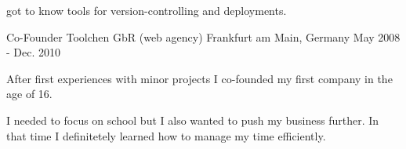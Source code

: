 \begin{cventries}
{\begin{cvitems}
      \item {got to know tools for version-controlling and deployments.}
    \end{cvitems}
  }
\cventry
  {Co-Founder}
  {Toolchen GbR (web agency)}
  {Frankfurt am Main, Germany}
  {May 2008 - Dec. 2010}
  {
    \begin{cvitems}
      \item {After first experiences with minor projects I co-founded my first company in the age of 16.}
      \item {I needed to focus on school but I also wanted to push my business further. In that time I definitetely learned how to manage my time efficiently.}
    \end{cvitems}
  }

\end{cventries}
